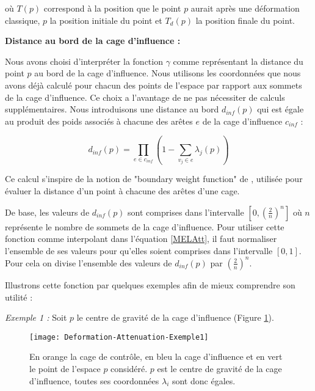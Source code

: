 où $T(p)$ correspond à la position que le point $p$ aurait après une déformation
classique, $p$ la position initiale du point et $T_{d}(p)$ la position finale
du point.

\textbf{Distance au bord de la cage d'influence :}

Nous avons choisi d'interpréter la fonction $\gamma$ comme représentant la
distance du point $p$ au bord de la cage d'influence. Nous utilisons les
coordonnées que nous avons déjà calculé pour chacun des points de l'espace par
rapport aux sommets de la cage d'influence. Ce choix a l'avantage de ne pas
nécessiter de calculs supplémentaires. Nous introduisons une distance au bord
$d_{inf}(p)$ qui est égale au produit des poids associés à chacune des arêtes
$e$ de la cage d'influence $c_{inf}$ :

\begin{equation}
  d_{inf}(p) = \prod_{e \in c_{inf}} (1 - \sum_{v_j \in e} \lambda_j(p))
  \label{MELInf}
\end{equation}

Ce calcul s'inspire de la notion de "boundary weight function" de
\cite{GPCP13}, utilisée pour évaluer la distance d'un point à chacune des
arêtes d'une cage.

De base, les valeurs de $d_{inf}(p)$ sont comprises dans l'intervalle
$[0,(\frac{2}{n})^n]$ où $n$ représente le nombre de sommets de la cage
d'influence. Pour utiliser cette fonction comme interpolant dans l'équation
\ref{MELAtt}, il faut normaliser l'ensemble de ses valeurs pour qu'elles
soient comprises dans l'intervalle $[0,1]$. Pour cela on divise l'ensemble des
valeurs de $d_{inf}(p)$ par $(\frac{2}{n})^n$.

Illustrons cette fonction par quelques exemples afin de mieux comprendre son
utilité :

\textit{Exemple 1 :} Soit $p$ le centre de gravité de la cage d'influence
(Figure \ref{MELEx1}).

\begin{figure}[ht]
\begin{center}
\texttt{[image: Deformation-Attenuation-Exemple1]}

\caption[Atténuation : Exemple 1] {En orange la cage de contrôle, en bleu la
cage d'influence et en vert le point de l'espace $p$ considéré. $p$ est le
centre de gravité de la cage d'influence, toutes ses coordonnées $\lambda_i$
sont donc égales.}

\label{MELEx1}
\end{center}
\end{figure}

